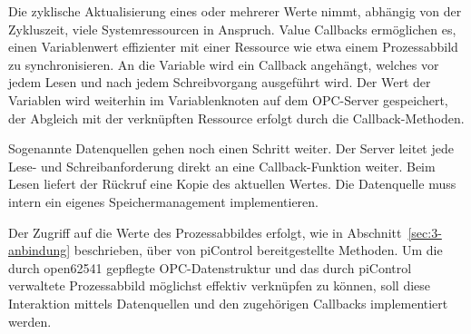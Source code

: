 Die zyklische Aktualisierung eines oder mehrerer Werte nimmt, abhängig von der Zykluszeit, viele Systemressourcen in Anspruch. Value Callbacks ermöglichen es, einen Variablenwert effizienter mit einer Ressource wie etwa einem Prozessabbild zu synchronisieren. An die Variable wird ein Callback angehängt, welches vor jedem Lesen und nach jedem Schreibvorgang ausgeführt wird.
Der Wert der Variablen wird weiterhin im Variablenknoten auf dem OPC-Server gespeichert, der Abgleich mit der verknüpften Ressource erfolgt durch die Callback-Methoden.

Sogenannte Datenquellen gehen noch einen Schritt weiter. Der Server leitet jede Lese- und Schreibanforderung direkt an eine Callback-Funktion weiter. Beim Lesen liefert der Rückruf eine Kopie des aktuellen Wertes. Die Datenquelle muss intern ein eigenes Speichermanagement implementieren.

Der Zugriff auf die Werte des Prozessabbildes erfolgt, wie in Abschnitt~\ref{sec:3-anbindung} beschrieben, über von piControl bereitgestellte Methoden. Um die durch open62541 gepflegte OPC-Datenstruktur und das durch piControl verwaltete Prozessabbild möglichst effektiv verknüpfen zu können, soll diese Interaktion mittels Datenquellen und den zugehörigen Callbacks implementiert werden.